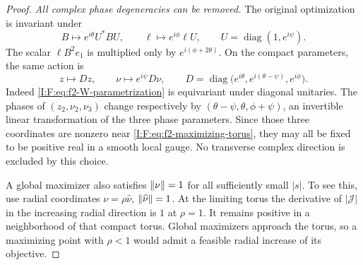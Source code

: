 \begin{proof}
\emph{All complex phase degeneracies can be removed.}
The original optimization is invariant under
\begin{equation}
 B\longmapsto e^{i\theta}U^*BU,\qquad
 \ell\longmapsto e^{i\phi}\ell U,\qquad
 U=\operatorname{diag}(1,e^{i\psi}).
 \label{I:F:eq:f2-phase-action}
\end{equation}
The scalar $\ell B^2e_1$ is multiplied only by
$e^{i(\phi+2\theta)}$.  On the compact parameters, the same action is
\[
 z\longmapsto Dz,\qquad
 \nu\longmapsto e^{i\psi}D\nu,\qquad
 D=\operatorname{diag}\bigl(e^{i\theta},e^{i(\theta-\psi)},e^{i\phi}\bigr).
\]
Indeed \eqref{I:F:eq:f2-W-parametrization} is equivariant under diagonal
unitaries.  The phases of $(z_2,\nu_2,\nu_3)$ change respectively by
$(\theta-\psi,\theta,\phi+\psi)$, an invertible linear transformation
of the three phase parameters.  Since those three coordinates are
nonzero near \eqref{I:F:eq:f2-maximizing-torus}, they may all be fixed to be
positive real in a smooth local gauge.  No transverse complex direction
is excluded by this choice.

A global maximizer also satisfies $\left\lVert\nu\right\rVert=1$ for all sufficiently
small $|s|$.  To see this, use radial coordinates
$\nu=\rho\widehat\nu$, $\left\lVert\widehat\nu\right\rVert=1$.
At the limiting torus the derivative of
$|\mathcal J|$ in the increasing radial direction is $1$ at $\rho=1$.
It remains positive in a neighborhood of that compact torus.  Global
maximizers approach the torus, so a maximizing point with $\rho<1$
would admit a feasible radial increase of its objective.


\end{proof}
